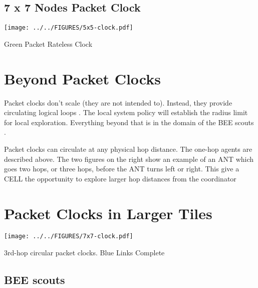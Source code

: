 \documentclass[../HFT-main.tex]{subfiles}
\begin{document}

\newpage

\subsection{7 x 7 Nodes Packet Clock}

 \begin{marginfigure}
        \texttt{[image: ../../FIGURES/5x5-clock.pdf]} %
  \caption{Green Packet Rateless Clock}
    \vspace{20pt}
\end{marginfigure}

\section{Beyond Packet Clocks}

Packet clocks don't scale (they are not intended to). Instead, they provide circulating logical loops \cite{Logical Clocks}.  The local system policy will establish the radius limit for local exploration. Everything beyond that is in the domain of the BEE scouts .

Packet clocks can circulate at any physical hop distance. The one-hop agents are described above.  The two figures on the right show an example of an ANT which goes two hops, or three hops, before the ANT turns left or right.  This give a CELL the opportunity to explore larger hop distances from the coordinator

\section{Packet Clocks in Larger Tiles}

 \begin{marginfigure}
        \texttt{[image: ../../FIGURES/7x7-clock.pdf]} %
  \caption{3rd-hop circular packet clocks. Blue Links Complete}
    \vspace{20pt}
\end{marginfigure}

\subsection{BEE scouts}
\end{document}
